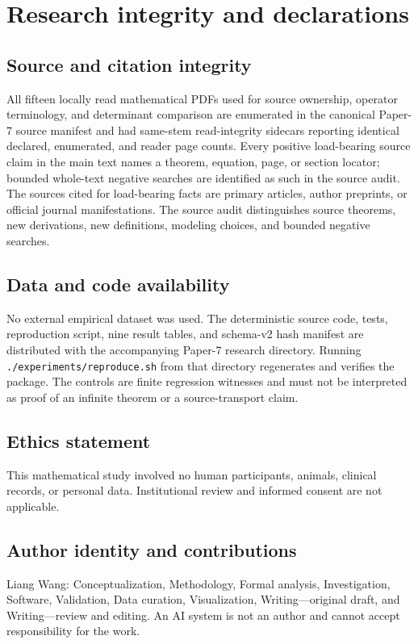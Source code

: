 \documentclass[11pt,a4paper]{article}
\theoremstyle{definition}
\begin{document}
\section{Research integrity and declarations}

\subsection*{Source and citation integrity}
All fifteen locally read mathematical PDFs used for source ownership,
operator terminology, and determinant comparison are enumerated in the
canonical Paper-7 source manifest and had same-stem read-integrity sidecars
reporting identical declared, enumerated, and reader page counts.  Every
positive load-bearing source claim in the main text names a theorem, equation,
page, or section locator; bounded whole-text negative searches are identified
as such in the source audit.  The sources cited for load-bearing facts are primary
articles, author preprints, or official journal manifestations.  The source
audit distinguishes source theorems, new derivations, new definitions,
modeling choices, and bounded negative searches.

\subsection*{Data and code availability}
No external empirical dataset was used.  The deterministic source code,
tests, reproduction script, nine result tables, and schema-v2 hash manifest
are distributed with the accompanying Paper-7 research directory.  Running
\texttt{./experiments/reproduce.sh} from that directory regenerates and
verifies the package.  The controls are finite regression witnesses and must
not be interpreted as proof of an infinite theorem or a source-transport
claim.

\subsection*{Ethics statement}
This mathematical study involved no human participants, animals, clinical
records, or personal data.  Institutional review and informed consent are not
applicable.

\subsection*{Author identity and contributions}
Liang Wang: Conceptualization, Methodology, Formal analysis, Investigation,
Software, Validation, Data curation, Visualization, Writing---original draft,
and Writing---review and editing.  An AI system is not an author and cannot
accept responsibility for the work.
\end{document}

